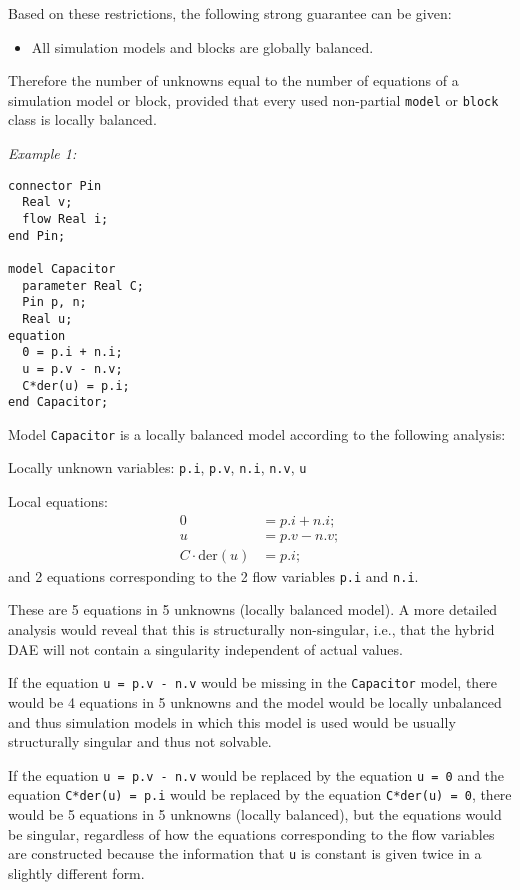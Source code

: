 Based on these restrictions, the following strong guarantee can be given:
\begin{itemize}
\item All simulation models and blocks are globally balanced.
\end{itemize}

\begin{nonnormative}
Therefore the number of unknowns equal to the number of equations of a simulation model or block, provided that every used non-partial \lstinline!model! or \lstinline!block! class is locally balanced.
\end{nonnormative}

\begin{example}
\emph{Example 1:}
\begin{lstlisting}[language=modelica]
connector Pin
  Real v;
  flow Real i;
end Pin;

model Capacitor
  parameter Real C;
  Pin p, n;
  Real u;
equation
  0 = p.i + n.i;
  u = p.v - n.v;
  C*der(u) = p.i;
end Capacitor;
\end{lstlisting}

Model \lstinline!Capacitor! is a locally balanced model according to the following analysis:

Locally unknown variables: \lstinline!p.i!, \lstinline!p.v!, \lstinline!n.i!, \lstinline!n.v!, \lstinline!u!

Local equations:
\begin{align*}
0 &= p.i + n.i;\\
u &= p.v - n.v;\\
C \cdot \text{der}(u) &= p.i;
\end{align*}
and 2 equations corresponding to the 2 flow variables \lstinline!p.i! and \lstinline!n.i!.

These are 5 equations in 5 unknowns (locally balanced model).
A more detailed analysis would reveal that this is structurally non-singular, i.e., that the hybrid DAE will not contain a singularity independent of actual values.

If the equation \lstinline!u = p.v - n.v! would be missing in the \lstinline!Capacitor! model, there would be 4 equations in 5 unknowns and the model would be locally unbalanced and thus simulation models in which this model is used would be usually structurally singular and thus not solvable.

If the equation \lstinline!u = p.v - n.v! would be replaced by the equation \lstinline!u = 0! and the equation \lstinline!C*der(u) = p.i! would be replaced by the equation \lstinline!C*der(u) = 0!, there would be 5 equations in 5 unknowns (locally balanced), but the equations would be singular, regardless of how the equations corresponding to the flow variables are constructed because the information that \lstinline!u! is constant is given twice in a slightly different form.
\end{example}

